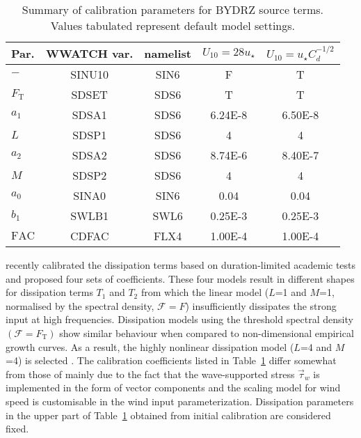 \begin{table} \begin{center}
\begin{tabular}{|l|c|c|c|c|} \hline \hline
Par.         &  WWATCH var. & namelist & $U_{10}=28u_\star$ & $U_{10}=u_\star C^{-1/2}_{d}$  \\
\hline
  $-$              &  SINU10      & SIN6     &  F      &   T           \\
  $F_{\mathrm{T}}$ &  SDSET       & SDS6     &  T      &   T            \\
  $a_1$            &  SDSA1       & SDS6     & 6.24E-8 &   6.50E-8      \\
  $L$              &  SDSP1       & SDS6     &  4      &   4            \\
  $a_2$            &  SDSA2       & SDS6     & 8.74E-6 &   8.40E-7      \\
  $M$              &  SDSP2       & SDS6     &  4      &   4            \\
\hline
  $a_0$            &  SINA0       & SIN6     & 0.04    &   0.04         \\
  $b_1$            &  SWLB1       & SWL6     & 0.25E-3 &   0.25E-3      \\
  $\mathrm{FAC}$   &  CDFAC       & FLX4     & 1.00E-4 &   1.00E-4      \\
 \hline \hline
\end{tabular} \end{center}
\caption{Summary of calibration parameters for BYDRZ source terms.
         Values tabulated represent default model settings.}
\label{tab:ST601} \botline \end{table}

\citet{art:RBW12} recently calibrated the dissipation terms based
on duration-limited academic tests and proposed four sets of coefficients.
These four models result in different shapes for dissipation terms $T_1$ and
$T_2$ from which the linear model ($L$=1 and $M$=1, normalised by the spectral
density, $\mathcal{F}=F$) insufficiently dissipates the strong input at high
frequencies. Dissipation models using the threshold spectral density
$(\mathcal{F}=F_{\mathrm{T}})$ show similar behaviour when compared to
non-dimensional empirical growth curves.  As a result, the highly nonlinear
dissipation model ($L$=4 and $M$=4) is selected \citep{art:RBW12}. The
calibration coefficients listed in Table~\ref{tab:ST601} differ somewhat from
those of \citet{art:RBW12} mainly due to the fact that the wave-supported
stress $\vec{\tau}_w$ is implemented in the form of vector components and the
scaling model for wind speed is customisable in the wind input
parameterization.  Dissipation parameters in the upper part of
Table~\ref{tab:ST601} obtained from initial calibration are considered fixed.

